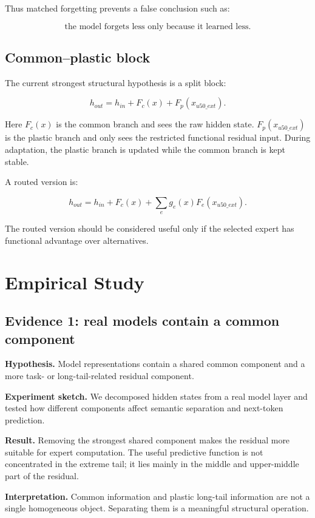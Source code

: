 \documentclass[11pt]{article}
\begin{document}
Thus matched forgetting prevents a false conclusion such as:

$$
\text{the model forgets less only because it learned less.}
$$

\subsection{Common--plastic block}

The current strongest structural hypothesis is a split block:

$$
h_{out}
=
h_{in}
+
F_c(x)
+
F_p(x_{u50\_ext}).
$$

Here $F_c(x)$ is the common branch and sees the raw hidden state. $F_p(x_{u50\_ext})$ is the plastic branch and only sees the restricted functional residual input. During adaptation, the plastic branch is updated while the common branch is kept stable.

A routed version is:

$$
h_{out}
=
h_{in}
+
F_c(x)
+
\sum_e g_e(x)F_e(x_{u50\_ext}).
$$

The routed version should be considered useful only if the selected expert has functional advantage over alternatives.

\section{Empirical Study}

\subsection{Evidence 1: real models contain a common component}

\textbf{Hypothesis.} Model representations contain a shared common component and a more task- or long-tail-related residual component.

\textbf{Experiment sketch.} We decomposed hidden states from a real model layer and tested how different components affect semantic separation and next-token prediction.

\textbf{Result.} Removing the strongest shared component makes the residual more suitable for expert computation. The useful predictive function is not concentrated in the extreme tail; it lies mainly in the middle and upper-middle part of the residual.

\textbf{Interpretation.} Common information and plastic long-tail information are not a single homogeneous object. Separating them is a meaningful structural operation.
\end{document}
